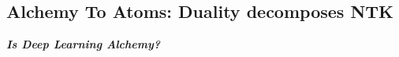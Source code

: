 \documentclass{article}
\begin{document}
\subsection{Alchemy To Atoms:  Duality decomposes NTK }
\begin{center}
\textbf{\emph{Is Deep Learning Alchemy?}}
\end{center}

%
\end{document}
